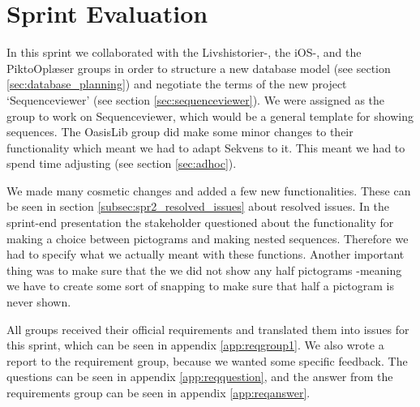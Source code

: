 \section{Sprint Evaluation}\label{sec:spr2_spreval}
In this sprint we collaborated with the Livshistorier-, the iOS-, and the PiktoOplæser groups in order to structure a new database model (see section \ref{sec:database_planning}) and negotiate the terms of the new project `Sequenceviewer' (see section \ref{sec:sequenceviewer}).
We were assigned as the group to work on Sequenceviewer, which would be a general template for showing sequences.
The OasisLib group did make some minor changes to their functionality which meant we had to adapt Sekvens to it. This meant we had to spend time adjusting (see section \ref{sec:adhoc}).

We made many cosmetic changes and added a few new functionalities. These can be seen in section \ref{subsec:spr2_resolved_issues} about resolved issues.
In the sprint-end presentation the stakeholder questioned about the functionality for making a choice between pictograms and making nested sequences.
Therefore we had to specify what we actually meant with these functions.
Another important thing was to make sure that the we did not show any half pictograms -meaning we have to create some sort of snapping to make sure that half a pictogram is never shown.

All groups received their official requirements and translated them into issues for this sprint, which can be seen in appendix \ref{app:reqgroup1}. We also wrote a report to the requirement group, because we wanted some specific feedback. The questions can be seen in appendix \ref{app:reqquestion}, and the answer from the requirements group can be seen in appendix \ref{app:reqanswer}.